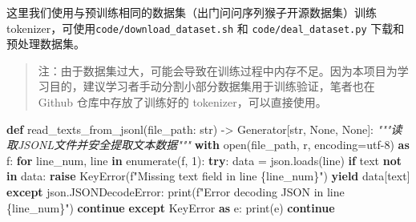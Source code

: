 \documentclass[
]{article}
\newenvironment{Shaded}{}{}
\newcommand{\BuiltInTok}[1]{\textcolor[rgb]{0.00,0.50,0.00}{#1}}
\newcommand{\CommentTok}[1]{\textcolor[rgb]{0.38,0.63,0.69}{\textit{#1}}}
\newcommand{\ControlFlowTok}[1]{\textcolor[rgb]{0.00,0.44,0.13}{\textbf{#1}}}
\newcommand{\DecValTok}[1]{\textcolor[rgb]{0.25,0.63,0.44}{#1}}
\newcommand{\ImportTok}[1]{\textcolor[rgb]{0.00,0.50,0.00}{\textbf{#1}}}
\newcommand{\KeywordTok}[1]{\textcolor[rgb]{0.00,0.44,0.13}{\textbf{#1}}}
\newcommand{\NormalTok}[1]{#1}
\newcommand{\OperatorTok}[1]{\textcolor[rgb]{0.40,0.40,0.40}{#1}}
\newcommand{\PreprocessorTok}[1]{\textcolor[rgb]{0.74,0.48,0.00}{#1}}
\newcommand{\SpecialCharTok}[1]{\textcolor[rgb]{0.25,0.44,0.63}{#1}}
\newcommand{\SpecialStringTok}[1]{\textcolor[rgb]{0.73,0.40,0.53}{#1}}
\newcommand{\StringTok}[1]{\textcolor[rgb]{0.25,0.44,0.63}{#1}}
\newcommand{\VariableTok}[1]{\textcolor[rgb]{0.10,0.09,0.49}{#1}}
\begin{document}
这里我们使用与预训练相同的数据集（出门问问序列猴子开源数据集）训练tokenizer，可使用\texttt{code/download\_dataset.sh}
和 \texttt{code/deal\_dataset.py} 下载和预处理数据集。

\begin{quote}
注：由于数据集过大，可能会导致在训练过程中内存不足。因为本项目为学习目的，建议学习者手动分割小部分数据集用于训练验证，笔者也在
Github 仓库中存放了训练好的 tokenizer，可以直接使用。
\end{quote}

\begin{Shaded}
\begin{Highlighting}[]
\KeywordTok{def}\NormalTok{ read\_texts\_from\_jsonl(file\_path: }\BuiltInTok{str}\NormalTok{) }\OperatorTok{{-}\textgreater{}}\NormalTok{ Generator[}\BuiltInTok{str}\NormalTok{, }\VariableTok{None}\NormalTok{, }\VariableTok{None}\NormalTok{]:}
    \CommentTok{"""读取JSONL文件并安全提取文本数据"""}
    \ControlFlowTok{with} \BuiltInTok{open}\NormalTok{(file\_path, }\StringTok{\textquotesingle{}r\textquotesingle{}}\NormalTok{, encoding}\OperatorTok{=}\StringTok{\textquotesingle{}utf{-}8\textquotesingle{}}\NormalTok{) }\ImportTok{as}\NormalTok{ f:}
        \ControlFlowTok{for}\NormalTok{ line\_num, line }\KeywordTok{in} \BuiltInTok{enumerate}\NormalTok{(f, }\DecValTok{1}\NormalTok{):}
            \ControlFlowTok{try}\NormalTok{:}
\NormalTok{                data }\OperatorTok{=}\NormalTok{ json.loads(line)}
                \ControlFlowTok{if} \StringTok{\textquotesingle{}text\textquotesingle{}} \KeywordTok{not} \KeywordTok{in}\NormalTok{ data:}
                    \ControlFlowTok{raise} \PreprocessorTok{KeyError}\NormalTok{(}\SpecialStringTok{f"Missing \textquotesingle{}text\textquotesingle{} field in line }\SpecialCharTok{\{}\NormalTok{line\_num}\SpecialCharTok{\}}\SpecialStringTok{"}\NormalTok{)}
                \ControlFlowTok{yield}\NormalTok{ data[}\StringTok{\textquotesingle{}text\textquotesingle{}}\NormalTok{]}
            \ControlFlowTok{except}\NormalTok{ json.JSONDecodeError:}
                \BuiltInTok{print}\NormalTok{(}\SpecialStringTok{f"Error decoding JSON in line }\SpecialCharTok{\{}\NormalTok{line\_num}\SpecialCharTok{\}}\SpecialStringTok{"}\NormalTok{)}
                \ControlFlowTok{continue}
            \ControlFlowTok{except} \PreprocessorTok{KeyError} \ImportTok{as}\NormalTok{ e:}
                \BuiltInTok{print}\NormalTok{(e)}
                \ControlFlowTok{continue}
\end{Highlighting}
\end{Shaded}
\end{document}
